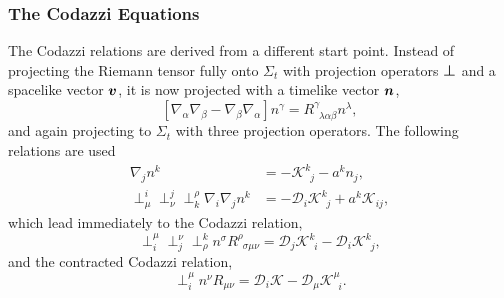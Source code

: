 \subsubsection{The Codazzi Equations}
The Codazzi relations are derived from a different start point. Instead of projecting the Riemann tensor fully onto $\Sigma_t$ with projection operators $\boldsymbol{\perp}$ and a spacelike vector $\boldsymbol{v}$, it is now projected with a timelike vector $\boldsymbol{n}$,
\begin{equation}\label{nr:eq:Riem(n)}  [\nabla_\alpha\nabla_\beta-\nabla_\beta\nabla_\alpha]n^\gamma = {R}^\gamma_{\,\,\,\lambda \alpha\beta}n^\lambda ,\end{equation}
and again projecting to $\Sigma_t$ with three projection operators. The following relations are used 
\begin{align} 
\nabla_ j  n^ k  &= -\mathcal{K}^ k _{\,\,\, j } - a^ k  n_ j ,\\
 \perp^ i _\mu \perp^ j _\nu \perp^\rho_ k  \nabla_ i  \nabla_ j  n^ k  &= -\mathcal{D}_ i  \mathcal{K}^ k _{\,\,\, j } + a^ k  \mathcal{K}_{ i  j },
 \end{align}
which lead immediately to the Codazzi relation,
\begin{equation}\perp_ i ^\mu \perp_ j ^\nu \perp^ k _\rho n^\sigma R^\rho_{\,\,\,\sigma\mu\nu} =  \mathcal{D}_ j  \mathcal{K}^ k _{\,\,\, i } -\mathcal{D}_ i  \mathcal{K}^ k _{\,\,\, j },\end{equation}
and the contracted Codazzi relation,
\begin{equation}\perp^\mu_ i   n^\nu R_{\mu\nu} =  \mathcal{D}_ i  \mathcal{K} -\mathcal{D}_\mu \mathcal{K}^\mu_{\,\,\, i }.\end{equation}

